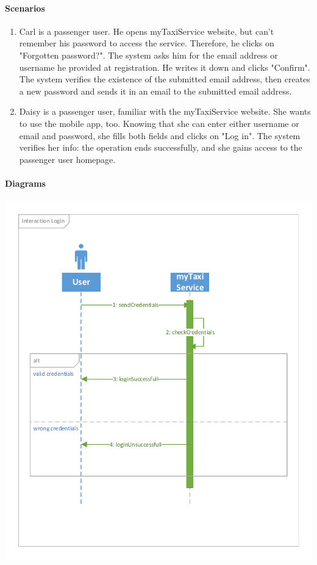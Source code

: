 \paragraph{Scenarios}
\begin{enumerate}
	\item Carl is a passenger user. He opens myTaxiService website, but can't remember his password to access the service. Therefore, he clicks on "Forgotten password?". The system asks him for the email address or username he provided at registration. He writes it down and clicks "Confirm". The system verifies the existence of the submitted email address, then creates a new password and sends it in an email to the submitted email address.
	
	\item Daisy is a passenger user, familiar with the myTaxiService website. She wants to use the mobile app, too. Knowing that she can enter either username or email and password, she fills both fields and clicks on "Log in". The system verifies her info: the operation ends successfully, and she gains access to the passenger user homepage.
\end{enumerate}

\paragraph{Diagrams}
\begin{center}
	\includegraphics[height=\textwidth]{diagrams/login}
\end{center}
